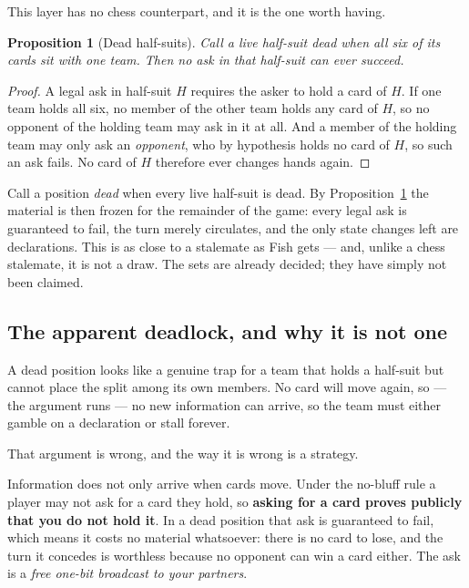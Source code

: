 \documentclass[11pt,a4paper]{article}
\newtheorem{proposition}{Proposition}
\begin{document}
This layer has no chess counterpart, and it is the one worth having.

\begin{proposition}[Dead half-suits]
\label{prop:dead}
Call a live half-suit \emph{dead} when all six of its cards sit with one team.
Then no ask in that half-suit can ever succeed.
\end{proposition}

\begin{proof}
A legal ask in half-suit $H$ requires the asker to hold a card of $H$. If one
team holds all six, no member of the other team holds any card of $H$, so no
opponent of the holding team may ask in it at all. And a member of the holding
team may only ask an \emph{opponent}, who by hypothesis holds no card of $H$, so
such an ask fails. No card of $H$ therefore ever changes hands again.
\end{proof}

Call a position \emph{dead} when every live half-suit is dead. By
Proposition~\ref{prop:dead} the material is then frozen for the remainder of the
game: every legal ask is guaranteed to fail, the turn merely circulates, and the
only state changes left are declarations. This is as close to a stalemate as
Fish gets --- and, unlike a chess stalemate, it is not a draw. The sets are
already decided; they have simply not been claimed.

\subsection{The apparent deadlock, and why it is not one}

A dead position looks like a genuine trap for a team that holds a half-suit but
cannot place the split among its own members. No card will move again, so
--- the argument runs --- no new information can arrive, so the team must either
gamble on a declaration or stall forever.

That argument is wrong, and the way it is wrong is a strategy.

Information does not only arrive when cards move. Under the no-bluff rule a
player may not ask for a card they hold, so \textbf{asking for a card proves
publicly that you do not hold it}. In a dead position that ask is guaranteed to
fail, which means it costs no material whatsoever: there is no card to lose, and
the turn it concedes is worthless because no opponent can win a card either. The
ask is a \emph{free one-bit broadcast to your partners}.
\end{document}
